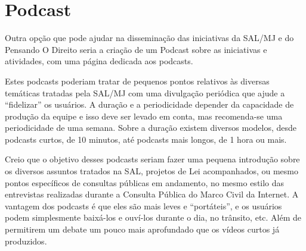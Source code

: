 \section{Podcast}
Outra opção que pode ajudar na disseminação das iniciativas da SAL/MJ e do Pensando O Direito seria a criação de um Podcast sobre as iniciativas e atividades, com uma página dedicada aos podcasts.

Estes podcasts poderiam tratar de pequenos pontos relativos às diversas temáticas tratadas pela SAL/MJ com uma divulgação periódica que ajude a ``fidelizar'' os usuários.
A duração e a periodicidade depender da capacidade de produção da equipe e isso deve ser levado em conta, mas recomenda-se uma periodicidade de uma semana. Sobre a duração existem diversos modelos, desde podcasts curtos, de 10 minutos, até podcasts mais longos, de 1 hora ou mais.

Creio que o objetivo desses podcasts seriam fazer uma pequena introdução sobre os diversos assuntos tratados na SAL, projetos de Lei acompanhados, ou mesmo pontos específicos de consultas públicas em andamento, no mesmo estilo das entrevistas realizadas durante a Consulta Pública do Marco Civil da Internet. A vantagem dos podcasts é que eles são mais leves e ``portáteis'', e os usuários podem simplesmente baixá-los e ouví-los durante o dia, no trânsito, etc. Além de permitirem um debate um pouco mais aprofundado que os vídeos curtos já produzidos.

